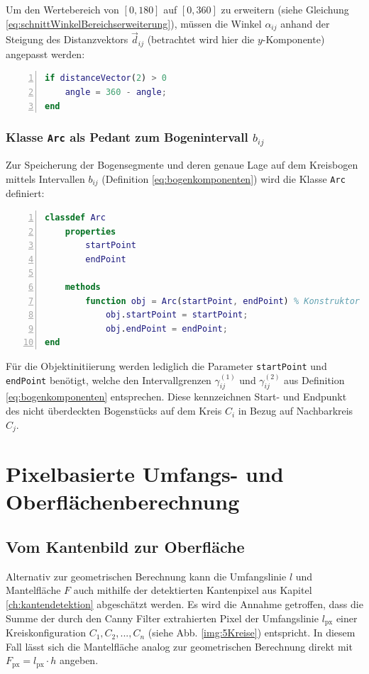 \documentclass[accentcolor=tud1c, 11pt, toc=bib, toc=listof, captions=abovetable, parskip=half]{tudreport}
\begin{document}
Um den Wertebereich von $[0,180]$ auf $[0,360]$ zu erweitern (siehe Gleichung \ref{eq:schnittWinkelBereichserweiterung}), müssen die Winkel $\alpha_{ij}$ anhand der Steigung des Distanzvektors $\vec{d}_{ij}$ (betrachtet wird hier die $y$-Komponente) angepasst werden:
\begin{lstlisting}[frame=single, language=MATLAB, numbers=left, basicstyle=\ttfamily, caption=Erweiterung des Bildbereichs der Schnittwinkelformel \ref{eq:schnittwinkel}, label=lst:distanceVectorsExtension]
if distanceVector(2) > 0
	angle = 360 - angle;
end
\end{lstlisting}

\subsubsection{Klasse \lstinline|Arc| als Pedant zum Bogenintervall $b_{ij}$}
Zur Speicherung der Bogensegmente und deren genaue Lage auf dem Kreisbogen mittels Intervallen $b_{ij}$ (Definition \ref{eq:bogenkomponenten})  wird die Klasse \lstinline|Arc| definiert:
\begin{lstlisting}[frame=single, language=MATLAB, numbers=left, basicstyle=\ttfamily, caption=Vereinfachter Code zur Klasse \lstinline|Arc|, label=lst:arcDef]
classdef Arc
	properties
		startPoint
		endPoint
	
	methods
		function obj = Arc(startPoint, endPoint) % Konstruktor
			obj.startPoint = startPoint;
			obj.endPoint = endPoint;
end
\end{lstlisting}

Für die Objektinitiierung werden lediglich die Parameter \lstinline|startPoint| und \lstinline|endPoint| benötigt, welche den Intervallgrenzen $\gamma_{ij}^{(1)}$ und $\gamma_{ij}^{(2)}$ aus Definition \ref{eq:bogenkomponenten} entsprechen. Diese kennzeichnen Start- und Endpunkt des nicht überdeckten Bogenstücks auf dem Kreis $C_i$ in Bezug auf Nachbarkreis $C_j$.

\section{Pixelbasierte Umfangs- und Oberflächenberechnung}
\subsection{Vom Kantenbild zur Oberfläche}
\label{pixelbasierteUmfangsberechnung}
Alternativ zur geometrischen Berechnung kann die Umfangslinie $l$ und Mantelfläche $F$ auch mithilfe der detektierten Kantenpixel aus Kapitel \ref{ch:kantendetektion} abgeschätzt werden. Es wird die Annahme getroffen, dass die Summe der durch den Canny Filter extrahierten Pixel der Umfangslinie $l_{\text{px}}$ einer Kreiskonfiguration $C_1,C_2,...,C_n$ (siehe Abb. \ref{img:5Kreise}) entspricht. In diesem Fall lässt sich die Mantelfläche analog zur geometrischen Berechnung direkt mit $F_{\text{px}} = l_{\text{px}} \cdot h$ angeben.\\
\end{document}
